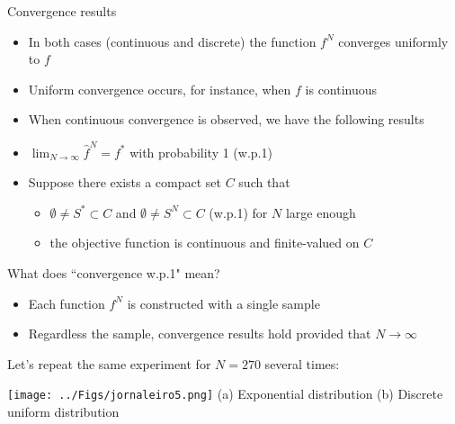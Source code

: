 \begin{frame}{Convergence results}



\begin{itemize}
\item In both cases (continuous and discrete) the function  $f^N$ converges uniformly to $f$
\pula

\item Uniform convergence occurs, for instance, when $f$ is continuous 
\pula

\item When continuous convergence is observed, we have the following results
\end{itemize}

\begin{theorem}

\begin{itemize}
\item $\lim_{N \to \infty} \hat f^N = f^*$ with probability 1 (w.p.1)
\pula
\item Suppose there exists a compact set $C$ such that
\begin{itemize}
\item $\emptyset\neq S^* \subset  C$ and $\emptyset\neq S^N \subset  C$ (w.p.1) for $N$ large enough
\item the objective function is continuous and finite-valued on $C$ 
\end{itemize}
\pula
{}
\end{itemize}
\end{theorem}
 \end{frame} 


\begin{frame}{What does ``convergence w.p.1" mean?}

\begin{itemize}
\item  Each function  $f^N$ is constructed with a single sample
\pula
\item Regardless the sample,  convergence results hold provided that $N \to \infty$ 
\end{itemize}
\pula
Let's repeat the same experiment for $N=270$ several times:


\begin{center}
\texttt{[image: ../Figs/jornaleiro5.png]} {}
{\small
(a) Exponential distribution \quad \quad (b) Discrete uniform distribution}
\end{center}
 \end{frame} 
 
